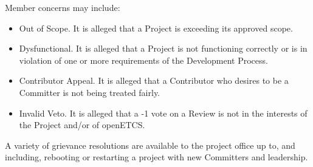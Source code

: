 Member concerns may include:

\begin{itemize}

\item
  Out of Scope. It is alleged that a Project is exceeding its approved
  scope.
\item
  Dysfunctional. It is alleged that a Project is not functioning
  correctly or is in violation of one or more requirements of the
  Development Process.
\item
  Contributor Appeal. It is alleged that a Contributor who desires to be
  a Committer is not being treated fairly.
\item
  Invalid Veto. It is alleged that a -1 vote on a Review is not in the
  interests of the Project and/or of openETCS.
\end{itemize}

A variety of grievance resolutions are available to the project office
up to, and including, rebooting or restarting a project with new
Committers and leadership.

